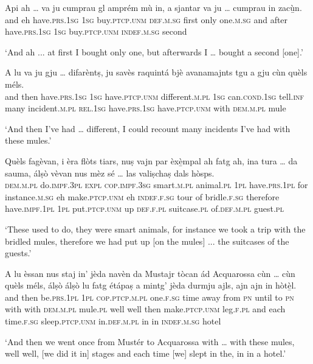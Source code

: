 \begin{linenumbers}
\gll  Api ah … va ju cumprau gl amprém mù in, a sjantar va ju … cumprau in zacù̱n.\\
and eh {} have.\textsc{prs.1sg} \textsc{1sg} buy.\textsc{ptcp.unm} \textsc{def.m.sg} first only one.\textsc{m.sg} and after  have.\textsc{prs.1sg} \textsc{1sg} {} buy.\textsc{ptcp.unm}  \textsc{indef.m.sg} second\\
\end{linenumbers}
\medskip
\glt `And ah ... at first I bought only one, but afterwards I … bought a second [one].'
\medskip

\begin{linenumbers}
\gll  A lu va ju gju … difarèntṣ, ju savès raquintá bjè avanamajnts tgu a gju cùn quèls méls.  \\
and then have.\textsc{prs.1sg} \textsc{1sg} have.\textsc{ptcp.unm} {} different.\textsc{m.pl} \textsc{1sg} can.\textsc{cond.1sg} tell.\textsc{inf} many incident.\textsc{m.pl} \textsc{rel.1sg} have.\textsc{prs.1sg} have.\textsc{ptcp.unm} with \textsc{dem.m.pl}  mule\\
\end{linenumbers}
\medskip
\glt `And then I’ve had … different, I could recount many incidents I’ve had with these mules.'
\medskip

\begin{linenumbers}
\gll  Quèls fagèvan, i èra flòts tiars, nuṣ vajn par èxè̱mpal ah fatg ah, ina tura … da sauma, álṣò vèvan nus mèz sé … las valiṣchaṣ dals hòsps.  \\
 \textsc{dem.m.pl} do.\textsc{impf.3pl} \textsc{expl} \textsc{cop.impf.3sg} smart.\textsc{m.pl} animal.\textsc{pl} \textsc{1pl} have.\textsc{prs.1pl} for instance.\textsc{m.sg} eh make.\textsc{ptcp.unm} eh \textsc{indef.f.sg} tour {} of bridle.\textsc{f.sg} therefore have.\textsc{impf.1pl} \textsc{1pl} put.\textsc{ptcp.unm} up {} \textsc{def.f.pl} suitcase.\textsc{pl}  of.\textsc{def.m.pl} guest.\textsc{pl} \\
\end{linenumbers}
\medskip
\glt `These used to do, they were smart animals, for instance we took a trip with the bridled mules, therefore we had put up [on the mules] ... the suitcases of the guests.'
\medskip

\begin{linenumbers}
\gll  A lu èssan nus staj in’ jèda navèn da Mustajr tòcan ád Acquarossa cùn … cùn quèls méls, álṣò álṣò lu fatg étápaṣ a mintg’ jèda durmju ajls, ajn ajn in hòtè̱l.\\
and then be.\textsc{prs.1pl} \textsc{1pl} \textsc{cop.ptcp.m.pl} one.\textsc{f.sg} time away from \textsc{pn} until to \textsc{pn} with {} with \textsc{dem.m.pl} mule.\textsc{pl} well well then make.\textsc{ptcp.unm}  leg.\textsc{f.pl} and each time.\textsc{f.sg} sleep.\textsc{ptcp.unm} in.\textsc{def.m.pl} in in \textsc{indef.m.sg} hotel\\
\end{linenumbers}
\medskip
\glt `And then we went once from Mustér to Acquarossa with … with these mules, well well, [we did it in] stages and each time [we] slept in the, in in a hotel.'
\medskip

